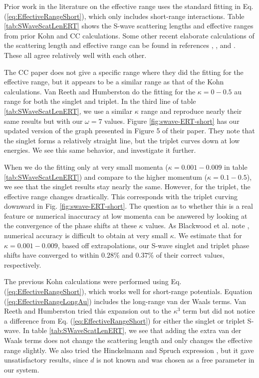 \documentclass[preprint,showpacs,preprintnumbers,amsmath,amssymb]{revtex4}
\begin{document}
Prior work in the literature \cite{Blackwood2002,Walters2004,VanReeth2003} on the effective range uses the standard fitting in Eq. (\ref{eq:EffectiveRangeShort}), which only includes short-range interactions. Table \ref{tab:SWaveScatLenERT} shows the S-wave scattering lengths and effective ranges from prior Kohn \cite{VanReeth2003} and CC \cite{Blackwood2002,Walters2004} calculations. Some other recent elaborate calculations of the scattering length and effective range can be found in references \cite{Sinha2000}, \cite{Chiesa2002}, and \cite{Ivanov2002}. These all agree relatively well with each other.

The CC paper \cite{Blackwood2002} does not give a specific range where they did the fitting for the effective range, but it appears to be a similar range as that of the Kohn calculations. Van Reeth and Humberston \cite{VanReeth2003} do the fitting for the $\kappa = 0-0.5$ au range for both the singlet and triplet. In the third line of table \ref{tab:SWaveScatLenERT}, we use a similar $\kappa$ range and reproduce nearly their same results but with our $\omega = 7$ values. Figure \ref{fig:swave-ERT-short} has our updated version of the graph presented in Figure 5 of their paper. They note that the singlet forms a relatively straight line, but the triplet curves down at low energies. We see this same behavior, and investigate it further.

When we do the fitting only at very small momenta ($\kappa = 0.001 - 0.009$ in table \ref{tab:SWaveScatLenERT}) and compare to the higher momentum ($\kappa = 0.1 - 0.5$), we see that the singlet results stay nearly the same. However, for the triplet, the effective range changes drastically. This corresponds with the triplet curving downward in Fig. \ref{fig:swave-ERT-short}. The question as to whether this is a real feature or numerical inaccuracy at low momenta can be answered by looking at the convergence of the phase shifts at these $\kappa$ values. As Blackwood et al. note \cite{Blackwood2002}, numerical accuracy is difficult to obtain at very small $\kappa$. We estimate that for $\kappa = 0.001 - 0.009$, based off extrapolations, our S-wave singlet and triplet phase shifts have converged to within $0.28\%$ and $0.37\%$ of their correct values, respectively.

The previous Kohn calculations \cite{VanReeth2003} were performed using Eq. (\ref{eq:EffectiveRangeShort}), which works well for short-range potentials. Equation (\ref{eq:EffectiveRangeLongAu}) includes the long-range van der Waals terms. Van Reeth and Humberston \cite{VanReeth2003} tried this expansion out to the $\kappa^3$ term but did not notice a difference from Eq. (\ref{eq:EffectiveRangeShort}) for either the singlet or triplet S-wave. In table \ref{tab:SWaveScatLenERT}, we see that adding the extra van der Waals terms does not change the scattering length and only changes the effective range slightly. We also tried the Hinckelmann and Spruch expression \cite{Hinckelmann1971}, but it gave unsatisfactory results, since $d$ is not known and was chosen as a free parameter in our system.
\end{document}
